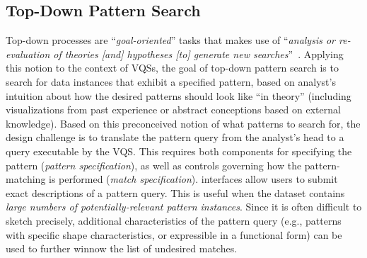    \subsection{Top-Down Pattern Search}
   Top-down processes are ``\textit{goal-oriented}'' tasks that makes use of ``\textit{analysis or re-evaluation of theories [and] hypotheses [to] generate new searches}''~\cite{Pirolli}. Applying this notion to the context of VQSs, the goal of top-down pattern search is to search for data instances that exhibit a specified pattern, based on analyst's intuition about how the desired patterns should look like ``in theory'' (including visualizations from past experience or abstract conceptions based on external knowledge). Based on this preconceived notion of what patterns to search for, the design challenge is to translate the pattern query from the analyst's head to a query executable by the VQS. This requires both components for specifying the pattern (\textit{pattern specification}), as well as controls governing how the pattern-matching is performed (\textit{match specification}).
    interfaces allow users to submit exact descriptions of a pattern query. This is useful when the dataset contains \emph{large numbers of potentially-relevant pattern instances}.
   Since it is often difficult to sketch precisely, additional characteristics of the pattern query (e.g., patterns with specific shape characteristics, or expressible in a functional form) can be used to further winnow the list of undesired matches.%
